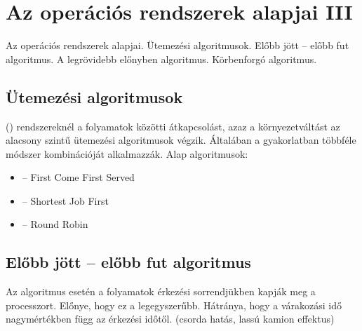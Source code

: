 \documentclass[../main.tex]{subfiles}
\begin{document}
\section{Az operációs rendszerek alapjai III}

\begin{fulltheorem}
  Az operációs rendszerek alapjai. Ütemezési algoritmusok.
  Előbb jött -- előbb fut algoritmus. A legrövidebb előnyben algoritmus.
  Körbenforgó algoritmus.
\end{fulltheorem}

\subsection{Ütemezési algoritmusok}

 () rendszereknél a folyamatok közötti
átkapcsolást, azaz a környezetváltást az alacsony szintű ütemezési algoritmusok
végzik. Általában a gyakorlatban többféle módszer kombinációját alkalmazzák.
Alap algoritmusok:
\begin{itemize}
  \item {} \tabto{1.2cm} – \tabto{1.8cm}
        First Come First Served

  \item {} \tabto{1.1cm} – \tabto{1.8cm}
        Shortest Job First

  \item {} \tabto{1cm} – \tabto{1.8cm}
        Round Robin
\end{itemize}

\subsection{Előbb jött -- előbb fut algoritmus}

Az  algoritmus esetén a folyamatok érkezési sorrendjükben kapják meg
a processzort. Előnye, hogy ez a legegyszerűbb. Hátránya, hogy a várakozási
idő nagymértékben függ az érkezési időtől.
(csorda hatás, lassú kamion effektus)
\end{document}
